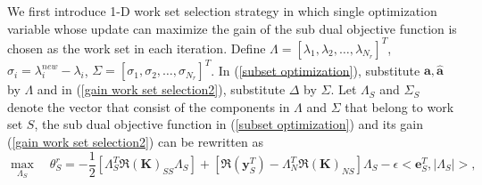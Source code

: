 \documentclass[12pt, draftclsnofoot, onecolumn]{IEEEtran}
\begin{document}
\begin{spacing}{2}
  We first introduce 1-D work set selection strategy in which single optimization variable whose update can maximize the gain of the sub dual objective function is chosen as the work set in each iteration. Define $\Lambda=[\lambda_{1}, \lambda_{2}, \ldots, \lambda_{N_{r}}]^{T}$, $\sigma_{i}=\lambda_{i}^{new}-\lambda_{i}$, $\Sigma=[\sigma_{1}, \sigma_{2}, \ldots, \sigma_{N_{r}}]^{T}$. In (\ref{subset optimization}), substitute $\mathbf{a}, \hat{\mathbf{a}}$ by $\Lambda$ and in (\ref{gain work set selection2}), substitute $\Delta$ by $\Sigma$. Let $\Lambda_{S}$ and $\Sigma_{S}$ denote the vector that consist of the components in $\Lambda$ and $\Sigma$ that belong to work set $S$, the sub dual objective function in (\ref{subset optimization}) and its gain (\ref{gain work set selection2}) can be rewritten as 
  \begin{equation}
\max_{\Lambda_{S}}\quad \theta_{S}^{r}=-\frac{1}{2}[\Lambda_{S}^{T}\Re{(\mathbf{K})}_{SS}\Lambda_{S}]+[\Re{(\mathbf{y}_{S}^{T})}-\Lambda_{N}^{T}\Re{(\mathbf{K})}_{NS}
]\Lambda_{S}-\epsilon<\mathbf{e}_{S}^{T}, |\Lambda_{S}|>,
\label{subset optimization lambda}
\end{equation}


\end{spacing}
\end{document}
